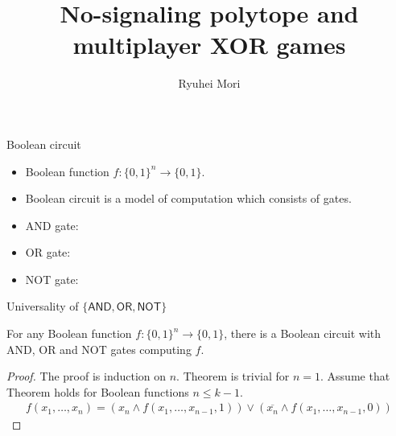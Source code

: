 \documentclass{beamer}
\title{No-signaling polytope and multiplayer XOR games}
\author{Ryuhei Mori}
\institute{Tokyo Institute of Technology}
\newcommand\emm[1]{\textcolor{redorange}{{#1}}}
\begin{document}
\begin{frame}[plain]
\maketitle
\end{frame}



\begin{frame}{Boolean circuit}
\begin{itemize}
\setlength{\itemsep}{2em}
\item Boolean function $f\colon \{0,1\}^n\to\{0,1\}$.
\item \emm{Boolean circuit} is a model of computation which consists of \emm{gates}.
\item AND gate:
\item OR gate:
\item NOT gate:
\end{itemize}
\end{frame}

\begin{frame}{Universality of $\{\mathsf{AND}, \mathsf{OR},\mathsf{NOT}\}$}
\begin{theorem}
For any Boolean function $f\colon \{0,1\}^n\to\{0,1\}$, there is a Boolean circuit with AND, OR and NOT gates computing $f$.
\end{theorem}
\begin{proof}
The proof is induction on $n$. Theorem is trivial for $n=1$.
Assume that Theorem holds for Boolean functions $n \le k-1$.
\begin{align*}
f(x_1,\dotsc,x_n) = (x_n \wedge f(x_1,\dotsc,x_{n-1}, 1)) \vee (\overline{x_n} \wedge f(x_1,\dotsc,x_{n-1}, 0))
\end{align*}
\end{proof}
\end{frame}
\end{document}
